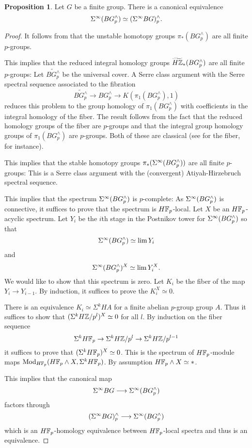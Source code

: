 \documentclass[10pt]{amsart}
\theoremstyle{definition}
\newtheorem{proposition}[theorem]{Proposition}
\begin{document}
\begin{proposition}\label{propCompleteBG}
Let $G$ be a finite group. There is a canonical equivalence
\[
\Sigma^{\infty} (BG^{\wedge}_{p}) \simeq (\Sigma^{\infty} BG)^{\wedge}_{p}.
\]
\end{proposition}
\begin{proof}
It follows from \cite[VII.4.3]{BousfieldKan} that the unstable homotopy groups $\pi_*(BG^{\wedge}_{p})$ are all finite $p$-groups.

This implies that the reduced integral homology groups $\widetilde{H\mathbb{Z}}_*(BG^{\wedge}_{p})$ are all finite $p$-groups: Let $\widetilde{BG^{\wedge}_{p}}$ be the universal cover. A Serre class argument with the Serre spectral sequence associated to the fibration
\[
\widetilde{BG^{\wedge}_{p}} \rightarrow BG^{\wedge}_{p} \rightarrow K(\pi_1(BG^{\wedge}_{p}),1)
\]
reduces this problem to the group homology of $\pi_1(BG^{\wedge}_{p})$ with coefficients in the integral homology of the fiber. The result follows from the fact that the reduced homology groups of the fiber are $p$-groups and that the integral group homology groups of $\pi_1(BG^{\wedge}_{p})$ are $p$-groups. Both of these are classical (see \cite[Chapter 10]{DavisKirk} for the fiber, for instance).

This implies that the stable homotopy groups $\pi_*(\Sigma^{\infty} (BG^{\wedge}_{p}))$ are all finite $p$-groups: This is a Serre class argument with the (convergent) Atiyah-Hirzebruch spectral sequence.

This implies that the spectrum $\Sigma^{\infty} (BG^{\wedge}_{p})$ is $p$-complete: As $\Sigma^{\infty} (BG^{\wedge}_{p})$ is connective, it suffices to prove that the spectrum is $H\mathbb{F}_p$-local. Let $X$ be an $H\mathbb{F}_p$-acyclic spectrum. Let $Y_i$ be the $i$th stage in the Postnikov tower for $\Sigma^{\infty} (BG^{\wedge}_{p})$ so that
\[
\Sigma^{\infty} (BG^{\wedge}_{p}) \simeq \lim Y_i
\]
and
\[
\Sigma^{\infty} (BG^{\wedge}_{p})^X \simeq \lim Y_{i}^{X}.
\]
We would like to show that this spectrum is zero. Let $K_i$ be the fiber of the map $Y_i \rightarrow Y_{i-1}$. By induction, it suffices to prove the $K_{i}^{X} \simeq 0$.

There is an equivalence $K_i \simeq \Sigma^k HA$ for a finite abelian $p$-group group $A$. Thus it suffices to show that $(\Sigma^k H\mathbb{Z}/p^l)^X \simeq 0$ for all $l$. By induction on the fiber sequence
\[
\Sigma^k H\mathbb{F}_p \rightarrow \Sigma^k H\mathbb{Z}/p^l \rightarrow \Sigma^k H\mathbb{Z}/p^{l-1}
\]
it suffices to prove that $(\Sigma^k H\mathbb{F}_p)^X \simeq 0$. This is the spectrum of $H\mathbb{F}_p$-module maps $\mathrm{Mod}_{H\mathbb{F}_p}(H\mathbb{F}_p \wedge X, \Sigma^k H\mathbb{F}_p)$. By assumption $H\mathbb{F}_p \wedge X \simeq *$.

This implies that the canonical map
\[
\Sigma^{\infty} BG \overset{}{\longrightarrow} \Sigma^{\infty} (BG^{\wedge}_{p})
\]
factors through
\[
(\Sigma^{\infty} BG)^{\wedge}_{p} \overset{}{\longrightarrow} \Sigma^{\infty} (BG^{\wedge}_{p})
\]
which is an $H\mathbb{F}_p$-homology equivalence between $H\mathbb{F}_p$-local spectra and thus is an equivalence.
\end{proof}
\end{document}

